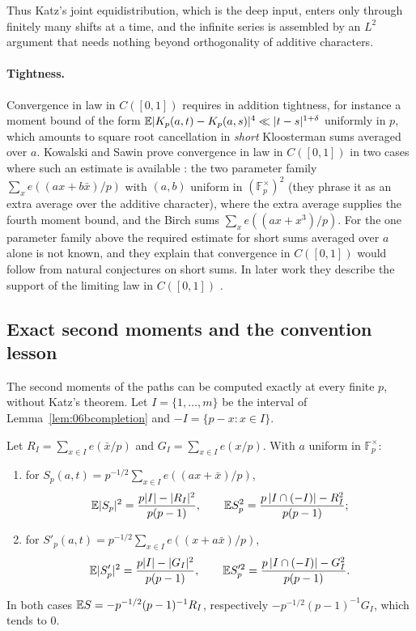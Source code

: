Thus Katz's joint equidistribution, which is the deep input, enters only through finitely many shifts at a time, and the infinite series is assembled by an $L^2$ argument that needs nothing beyond orthogonality of additive characters.

\paragraph{Tightness.} Convergence in law in $C([0,1])$ requires in addition tightness, for instance a moment bound of the form $\mathbb{E}|K_p(a,t)-K_p(a,s)|^4\ll|t-s|^{1+\delta}$ uniformly in $p$, which amounts to square root cancellation in \emph{short} Kloosterman sums averaged over $a$. Kowalski and Sawin prove convergence in law in $C([0,1])$ in two cases where such an estimate is available \cite{kowalskisawin2016}: the two parameter family $\sum_{x}e((ax+b\bar x)/p)$ with $(a,b)$ uniform in $(\mathbb{F}_p^\times)^2$ (they phrase it as an extra average over the additive character), where the extra average supplies the fourth moment bound, and the Birch sums $\sum_xe((ax+x^3)/p)$. For the one parameter family above the required estimate for short sums averaged over $a$ alone is not known, and they explain that convergence in $C([0,1])$ would follow from natural conjectures on short sums. In later work they describe the support of the limiting law in $C([0,1])$ \cite{kowalskisawin2017}.

\subsection{Exact second moments and the convention lesson}

The second moments of the paths can be computed exactly at every finite $p$, without Katz's theorem. Let $I=\{1,\dots,m\}$ be the interval of Lemma~\ref{lem:06bcompletion} and $-I=\{p-x:x\in I\}$.

\begin{proposition}\label{prop:06bsecond}
Let $R_I=\sum_{x\in I}e(\bar x/p)$ and $G_I=\sum_{x\in I}e(x/p)$. With $a$ uniform in $\mathbb{F}_p^\times$:
\begin{enumerate}
\item for $S_p(a,t)=p^{-1/2}\sum_{x\in I}e((ax+\bar x)/p)$,
\[
\mathbb{E}|S_p|^2=\frac{p|I|-|R_I|^2}{p(p-1)},\qquad\mathbb{E} S_p^2=\frac{p\,|I\cap(-I)|-R_I^2}{p(p-1)};
\]
\item for $S'_p(a,t)=p^{-1/2}\sum_{x\in I}e((x+a\bar x)/p)$,
\[
\mathbb{E}|S'_p|^2=\frac{p|I|-|G_I|^2}{p(p-1)},\qquad\mathbb{E} S_p'^2=\frac{p\,|I\cap(-I)|-G_I^2}{p(p-1)}.
\]
\end{enumerate}
In both cases $\mathbb{E} S=-p^{-1/2}(p-1)^{-1}R_I$, respectively $-p^{-1/2}(p-1)^{-1}G_I$, which tends to $0$.
\end{proposition}

